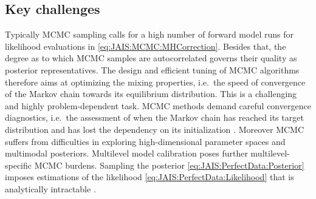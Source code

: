 \subsection{Key challenges} \label{sec:JAIS:Computation:KeyChallenges}
Typically MCMC sampling calls for a high number of forward model runs for likelihood evaluations in \cref{eq:JAIS:MCMC:MHCorrection}.
Besides that, the degree as to which MCMC samples are autocorrelated governs their quality as posterior representatives.
The design and efficient tuning of MCMC algorithms therefore aims at optimizing the mixing properties, i.e.\ the speed of convergence of the Markov chain towards its equilibrium distribution.
This is a challenging and highly problem-dependent task.
MCMC methods demand careful convergence diagnostics, i.e.\ the assessment of when the Markov chain has reached its target distribution and has lost the dependency on its initialization \cite{MCMC:Cowles1996,MCMC:Brooks1998:Roberts}.
Moreover MCMC suffers from difficulties in exploring high-dimensional parameter spaces and multimodal posteriors.
Multilevel model calibration poses further multilevel-specific MCMC burdens.
Sampling the posterior \cref{eq:JAIS:PerfectData:Posterior} imposes estimations of the likelihood \cref{eq:JAIS:PerfectData:Likelihood} that is analytically intractable \cite{MCMC:Diggle1984}.

